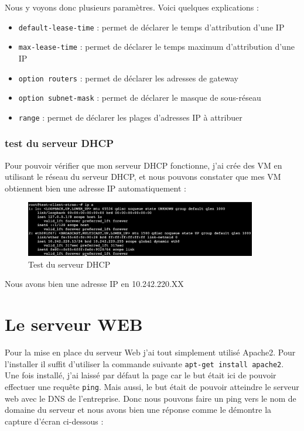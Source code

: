 \documentclass[12pt, a4paper]{article}
\begin{document}
    Nous y voyons donc plusieurs paramètres. Voici quelques explications :\\
    \begin{itemize}
        \item \texttt{default-lease-time} : permet de déclarer le temps d'attribution d'une IP
        \item \texttt{max-lease-time} : permet de déclarer le temps maximum d'attribution d'une IP
        \item \texttt{option routers} : permet de déclarer les adresses de gateway
        \item \texttt{option subnet-mask} : permet de déclarer le masque de sous-réseau
        \item \texttt{range} : permet de déclarer les plages d'adresses IP à attribuer
    \end{itemize}

    \subsubsection{test du serveur DHCP}
    Pour pouvoir vérifier que mon serveur DHCP fonctionne, j'ai crée des VM 
    en utilisant le réseau du serveur DHCP, et nous pouvons constater que 
    mes VM obtiennent bien une adresse IP automatiquement : 

    \begin{figure}[h]
		\centering
		\includegraphics[width=0.9\textwidth]{img/test-dhcp.png}
		\caption{Test du serveur DHCP}
		\label{fig:test-dhcp}
	\end{figure}

    Nous avons bien une adresse IP en 10.242.220.XX

\section{Le serveur WEB}
Pour la mise en place du serveur Web j'ai tout simplement utilisé Apache2.
Pour l'installer il suffit d'utiliser la commande suivante \texttt{apt-get install apache2}.
Une fois installé, j'ai laissé par défaut la page car le but était ici de 
pouvoir effectuer une requête \texttt{ping}. Mais aussi, le but était de pouvoir
atteindre le serveur web avec le DNS de l'entreprise. Donc nous pouvons 
faire un ping vers le nom de domaine du serveur et nous avons bien une réponse 
comme le démontre la capture d'écran ci-dessous : 
\end{document}
